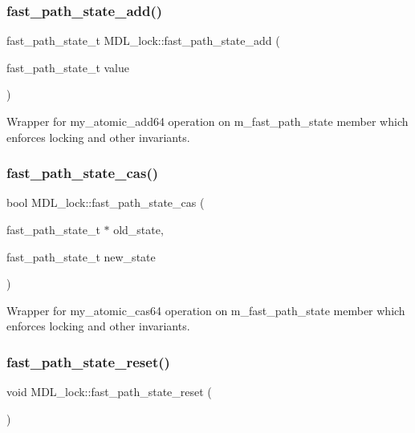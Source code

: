 \subsubsection{\texorpdfstring{fast\+\_\+path\+\_\+state\+\_\+add()}{fast\_path\_state\_add()}}
{\footnotesize\ttfamily fast\+\_\+path\+\_\+state\+\_\+t M\+D\+L\+\_\+lock\+::fast\+\_\+path\+\_\+state\+\_\+add (\begin{DoxyParamCaption}\item[{fast\+\_\+path\+\_\+state\+\_\+t}]{value }\end{DoxyParamCaption})\hspace{0.3cm}{\ttfamily [inline]}}

Wrapper for my\+\_\+atomic\+\_\+add64 operation on m\+\_\+fast\+\_\+path\+\_\+state member which enforces locking and other invariants. \mbox{\label{classMDL__lock_a716b40d532b18db6c2527d1a46908c29}} 
\subsubsection{\texorpdfstring{fast\+\_\+path\+\_\+state\+\_\+cas()}{fast\_path\_state\_cas()}}
{\footnotesize\ttfamily bool M\+D\+L\+\_\+lock\+::fast\+\_\+path\+\_\+state\+\_\+cas (\begin{DoxyParamCaption}\item[{fast\+\_\+path\+\_\+state\+\_\+t $\ast$}]{old\+\_\+state,  }\item[{fast\+\_\+path\+\_\+state\+\_\+t}]{new\+\_\+state }\end{DoxyParamCaption})\hspace{0.3cm}{\ttfamily [inline]}}

Wrapper for my\+\_\+atomic\+\_\+cas64 operation on m\+\_\+fast\+\_\+path\+\_\+state member which enforces locking and other invariants. \mbox{\label{classMDL__lock_aeedaf89f7d4526d4d59c170fed9ffe2a}} 
\subsubsection{\texorpdfstring{fast\+\_\+path\+\_\+state\+\_\+reset()}{fast\_path\_state\_reset()}}
{\footnotesize\ttfamily void M\+D\+L\+\_\+lock\+::fast\+\_\+path\+\_\+state\+\_\+reset (\begin{DoxyParamCaption}{ }\end{DoxyParamCaption})\hspace{0.3cm}{\ttfamily [inline]}}

